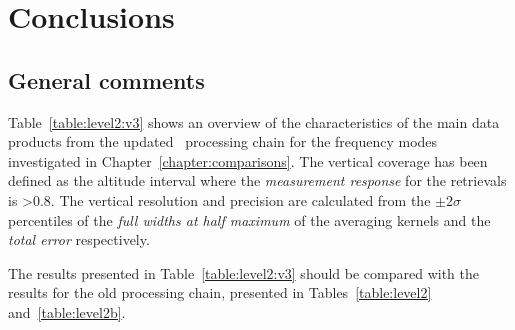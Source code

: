 \chapter{Conclusions}
\label{chapter:conclusions}
\section{General comments}


Table~\ref{table:level2:v3} shows an overview of the characteristics of the
main data products from the updated \smr\ processing chain for the frequency
modes investigated in Chapter~\ref{chapter:comparisons}. The vertical coverage
has been defined as the altitude interval where the \emph{measurement response}
for the retrievals is >0.8. The vertical resolution and precision are
calculated from the $\pm 2\sigma$ percentiles of the \emph{full widths at half
maximum} of the averaging kernels and the \emph{total error} respectively.

The results presented in Table~\ref{table:level2:v3} should be compared with
the results for the old processing chain, presented in
Tables~\ref{table:level2} and~\ref{table:level2b}.

